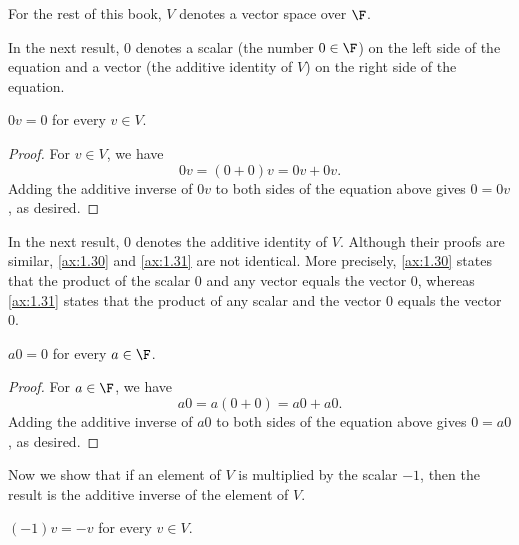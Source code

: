 \begin{notation}[$V$]\label{ax:1.29}
For the rest of this book, $V$ denotes a vector space over $\F$.
\end{notation}

In the next result, $0$ denotes a scalar (the number $0\in\F$) on the left side
of the equation and a vector (the additive identity of $V$) on the right side
of the equation.

\begin{result}\label{ax:1.30}
$0v=0$ for every $v\in V$.
\end{result}

\begin{proof}
For $v\in V$, we have
\[ 0v = (0+0)v = 0v+0v. \]
Adding the additive inverse of $0v$ to both sides of the equation above gives
$0=0v$, as desired.
\end{proof}

%
In the next result, $0$ denotes the additive identity of $V$. Although their
proofs are similar, \ref{ax:1.30} and \ref{ax:1.31} are not identical. More
precisely, \ref{ax:1.30} states that the product of the scalar $0$ and any
vector equals the vector $0$, whereas \ref{ax:1.31} states that the product of
any scalar and the vector $0$ equals the vector $0$.

\begin{result}\label{ax:1.31}
$a0=0$ for every $a\in\F$.
\end{result}

\begin{proof}
For $a\in\F$, we have
\[ a0 = a(0+0) = a0+a0. \]
Adding the additive inverse of $a0$ to both sides of the equation above gives
$0=a0$, as desired.
\end{proof}

Now we show that if an element of $V$ is multiplied by the scalar $-1$, then
the result is the additive inverse of the element of $V$.

\begin{result}\label{ax:1.32}
$(-1)v=-v$ for every $v\in V$.
\end{result}

